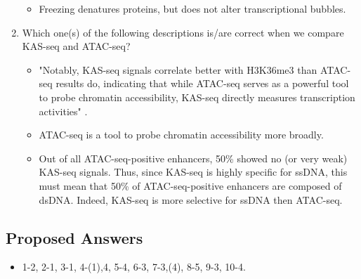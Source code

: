 \documentclass[../notes.tex]{subfiles}
\begin{document}
\begin{enumerate}
\begin{itemize}
        \item Freezing denatures proteins, but does not alter transcriptional bubbles.
    \end{itemize}
    \item Which one(s) of the following descriptions is/are correct when we compare KAS-seq and ATAC-seq?
    \begin{itemize}
        \item "Notably, KAS-seq signals correlate better with H3K36me3 than ATAC-seq results do, indicating that while ATAC-seq serves as a powerful tool to probe chromatin accessibility, KAS-seq directly measures transcription activities" \parencite[516]{bib:QuizReading}.
        \item ATAC-seq is a tool to probe chromatin accessibility more broadly.
        \item Out of all ATAC-seq-positive enhancers, 50\% showed no (or very weak) KAS-seq signals. Thus, since KAS-seq is highly specific for ssDNA, this must mean that 50\% of ATAC-seq-positive enhancers are composed of dsDNA. Indeed, KAS-seq is more selective for ssDNA then ATAC-seq.
    \end{itemize}
\end{enumerate}


\subsection*{Proposed Answers}
\begin{itemize}
    \item 1-2, 2-1, 3-1, 4-(1),4, 5-4, 6-3, 7-3,(4), 8-5, 9-3, 10-4.
\end{itemize}
\end{document}
